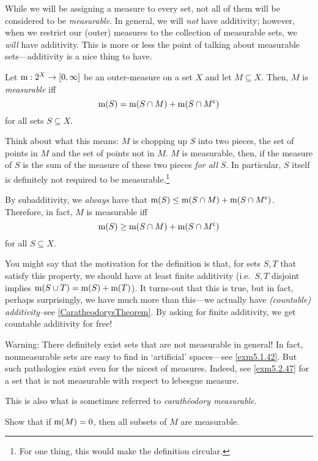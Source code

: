 While we will be assigning a measure to every set, not all of them will be considered to be \emph{measurable}.  In general, we will \emph{not} have additivity; however, when we restrict our (outer) measures to the collection of measurable sets, we \emph{will} have additivity.  This is more or less the point of talking about measurable sets---additivity is a nice thing to have.
\begin{dfn}\label{MeasurableSet}
Let $\mathrm{m} :2^X\rightarrow [0,\infty ]$ be an outer-measure on a set $X$ and let $M\subseteq X$.  Then, $M$ is \emph{measurable} iff
\begin{equation}
\mathrm{m} (S)=\mathrm{m} (S\cap M)+\mathrm{m} (S\cap M^{\mathsf{c}})
\end{equation}
for all sets $S\subseteq X$.
\begin{rmk}
Think about what this means:  $M$ is chopping up $S$ into two pieces, the set of points in $M$ and the set of points not in $M$.  $M$ is measurable, then, if the measure of $S$ is the sum of the measure of these two pieces \emph{for all} $S$.  In particular, $S$ itself is definitely not required to be measurable.\footnote{For one thing, this would make the definition circular.}
\end{rmk}
\begin{rmk}
By subadditivity, we \emph{always} have that $\mathrm{m} (S)\leq \mathrm{m} (S\cap M)+\mathrm{m} (S\cap M^{\mathsf{c}})$.  Therefore, in fact, $M$ is measurable iff
\begin{equation}
\mathrm{m} (S)\geq \mathrm{m} (S\cap M)+\mathrm{m} (S\cap M^{\mathsf{c}})
\end{equation}
for all $S\subseteq X$.
\end{rmk}
\begin{rmk}
You might say that the motivation for the definition is that, for sets $S,T$ that satisfy this property, we should have at least finite additivity (i.e.~$S,T$ disjoint implies $\mathrm{m} (S\cup T)=\mathrm{m} (S)+\mathrm{m} (T)$).  It turns-out that this is true, but in fact, perhaps surprisingly, we have much more than this---we actually have \emph{(countable) additivity}--see \cref{CaratheodorysTheorem}.  By asking for finite additivity, we get countable additivity for free!
\end{rmk}
\begin{rmk}
Warning:  There definitely exist sets that are not measurable in general!  In fact, nonmeasurable sets are easy to find in `artificial' spaces---see \cref{exm5.1.42}.  But such pathologies exist even for the nicest of measures.  Indeed, see \cref{exm5.2.47} for a set that is not measurable with respect to lebesgue measure.
\end{rmk}
\begin{rmk}
This is also what is sometimes referred to \emph{carath\'{e}odory measurable}.
\end{rmk}
\end{dfn}
\begin{exr}
Show that if $\mathrm{m} (M)=0$, then all subsets of $M$ are measurable.
\end{exr}

